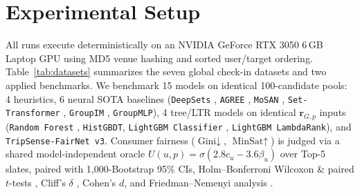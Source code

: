 \documentclass[final,5p,twocolumn]{elsarticle}
\begin{document}
\section{Experimental Setup}
\label{sec:setup}
All runs execute deterministically on an NVIDIA GeForce RTX 3050 6\,GB Laptop GPU using MD5 venue hashing and sorted user/target ordering. Table~\ref{tab:datasets} summarizes the seven global check-in datasets and two applied benchmarks. We benchmark 15 models on identical 100-candidate pools: 4 heuristics, 6 neural SOTA baselines (\texttt{DeepSets} \cite{zaheer2017deepsets}, \texttt{AGREE} \cite{cao2018attentive}, \texttt{MoSAN} \cite{tran2019mosan}, \texttt{Set-Transformer} \cite{lee2019settransformer}, \texttt{GroupIM} \cite{sankar2020groupim}, \texttt{GroupMLP}), 4 tree/LTR models on identical $\mathbf{r}_{G,p}$ inputs (\texttt{Random Forest} \cite{breiman2001random}, \texttt{HistGBDT}, \texttt{LightGBM Classifier} \cite{ke2017lightgbm}, \texttt{LightGBM LambdaRank}), and \texttt{TripSense-FairNet v3}. Consumer fairness ($\text{Gini}\downarrow$, $\text{MinSat}\uparrow$) is judged via a shared model-independent oracle $U(u, p) = \sigma(2.8 c_u - 3.6 \beta_u)$ over Top-5 slates, paired with 1,000-Bootstrap 95\% CIs, Holm--Bonferroni Wilcoxon \& paired $t$-tests \cite{holm1979simple}, Cliff's $\delta$ \cite{cliff1993dominance}, Cohen's $d$, and Friedman--Nemenyi analysis \cite{demsar2006statistical}.

\begin{table}[t]
\centering
\caption{Summary of Primary, Zero-Shot External, Out-of-Town, and Symbolic Benchmarks.}
\label{tab:datasets}
\end{table}
\end{document}
